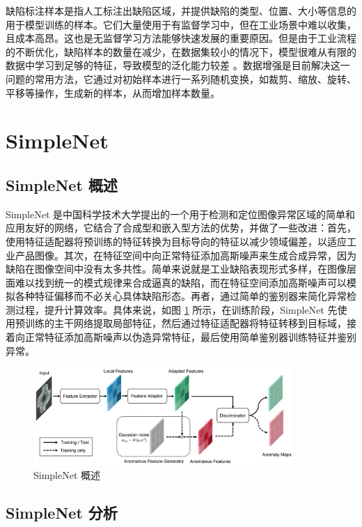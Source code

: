 \documentclass[
  ]{njuthesis}
\begin{document}
缺陷标注样本是指人工标注出缺陷区域，并提供缺陷的类型、位置、大小等信息的用于模型训练的样本。它们大量使用于有监督学习中，但在工业场景中难以收集，且成本高昂。这也是无监督学习方法能够快速发展的重要原因。但是由于工业流程的不断优化，缺陷样本的数量在减少，在数据集较小的情况下，模型很难从有限的数据中学习到足够的特征，导致模型的泛化能力较差 \cite{[8]}。数据增强是目前解决这一问题的常用方法，它通过对初始样本进行一系列随机变换，如裁剪、缩放、旋转、平移等操作，生成新的样本，从而增加样本数量。

\section{SimpleNet}

\subsection{SimpleNet 概述}

SimpleNet\cite{[9]} 是中国科学技术大学提出的一个用于检测和定位图像异常区域的简单和应用友好的网络，它结合了合成型和嵌入型方法的优势，并做了一些改进：首先，使用特征适配器将预训练的特征转换为目标导向的特征以减少领域偏差，以适应工业产品图像。其次，在特征空间中向正常特征添加高斯噪声来生成合成异常，因为缺陷在图像空间中没有太多共性。简单来说就是工业缺陷表现形式多样，在图像层面难以找到统一的模式规律来合成逼真的缺陷，而在特征空间添加高斯噪声可以模拟各种特征偏移而不必关心具体缺陷形态。再者，通过简单的鉴别器来简化异常检测过程，提升计算效率。具体来说，如图 \ref{SimpleNet} 所示，在训练阶段，SimpleNet 先使用预训练的主干网络提取局部特征，然后通过特征适配器将特征转移到目标域，接着向正常特征添加高斯噪声以伪造异常特征，最后使用简单鉴别器训练特征并鉴别异常。

\begin{figure}[ht]
    \centering
    \includegraphics[width=0.88\textwidth]{images/SimpleNet概述.png}
    \caption{SimpleNet 概述}
    \label{SimpleNet}
\end{figure}

\subsection{SimpleNet 分析}
\end{document}
